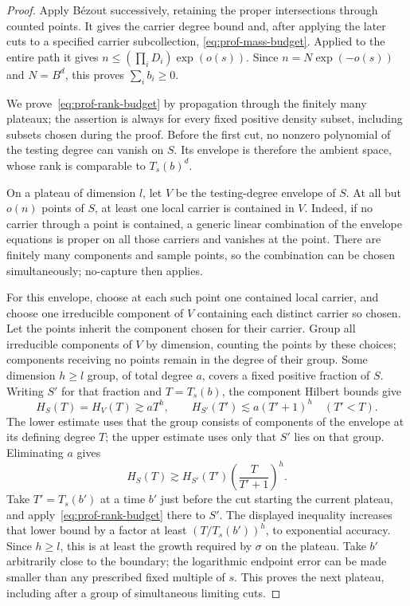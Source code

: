 \begin{proof}
Apply B\'ezout successively, retaining the proper intersections through counted points.  It gives the carrier degree bound and, after applying the later cuts to a specified carrier subcollection, \eqref{eq:prof-mass-budget}.  Applied to the entire path it gives $n\le(\prod_iD_i)\exp(o(s))$.  Since $n=N\exp(-o(s))$ and $N=B^d$, this proves $\sum_i b_i\ge0$.

We prove~\eqref{eq:prof-rank-budget} by propagation through the finitely many plateaux; the assertion is always for every fixed positive density subset, including subsets chosen during the proof.  Before the first cut, no nonzero polynomial of the testing degree can vanish on $S$.  Its envelope is therefore the ambient space, whose rank is comparable to $T_s(b)^d$.

On a plateau of dimension $l$, let $V$ be the testing-degree envelope of $S$. At all but $o(n)$ points of $S$, at least one local carrier is contained in $V$. Indeed, if no carrier through a point is contained, a generic linear combination of the envelope equations is proper on all those carriers and vanishes at the point. There are finitely many components and sample points, so the combination can be chosen simultaneously; no-capture then applies.

For this envelope, choose at each such point one contained local carrier, and choose one irreducible component of $V$ containing each distinct carrier so chosen. Let the points inherit the component chosen for their carrier. Group all irreducible components of $V$ by dimension, counting the points by these choices; components receiving no points remain in the degree of their group. Some dimension $h\ge l$ group, of total degree $a$, covers a fixed positive fraction of $S$. Writing $S'$ for that fraction and $T=T_s(b)$, the component Hilbert bounds give
\[
 H_S(T)=H_V(T)\gtrsim aT^h,\qquad
 H_{S'}(T')\lesssim a(T'+1)^h\quad(T'<T).
\]
The lower estimate uses that the group consists of components of the envelope at its defining degree $T$; the upper estimate uses only that $S'$ lies on that group.  Eliminating $a$ gives
\[
 H_S(T)\gtrsim H_{S'}(T')
       \left(\frac{T}{T'+1}\right)^h.
\]
Take $T'=T_s(b')$ at a time $b'$ just before the cut starting the current plateau, and apply~\eqref{eq:prof-rank-budget} there to $S'$. The displayed inequality increases that lower bound by a factor at least $(T/T_s(b'))^h$, to exponential accuracy.  Since $h\ge l$, this is at least the growth required by $\sigma$ on the plateau. Take $b'$ arbitrarily close to the boundary; the logarithmic endpoint error can be made smaller than any prescribed fixed multiple of $s$.  This proves the next plateau, including after a group of simultaneous limiting cuts.


\end{proof}

